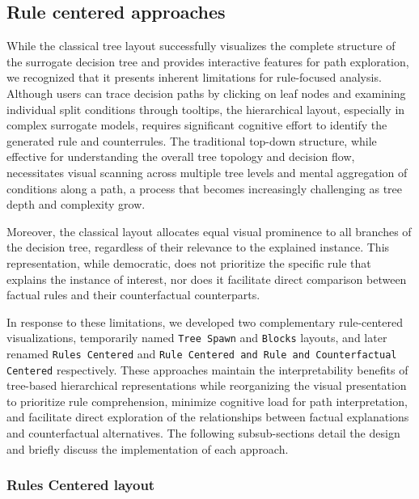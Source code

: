 \subsection{Rule centered approaches}

While the classical tree layout successfully visualizes the complete structure of the surrogate decision tree and provides interactive features for path exploration, we recognized that it presents inherent limitations for rule-focused analysis. Although users can trace decision paths by clicking on leaf nodes and examining individual split conditions through tooltips, the hierarchical layout, especially in complex surrogate models, requires significant cognitive effort to identify the generated rule and counterrules. 
The traditional top-down structure, while effective for understanding the overall tree topology and decision flow, necessitates visual scanning across multiple tree levels and mental aggregation of conditions along a path, a process that becomes increasingly challenging as tree depth and complexity grow.

Moreover, the classical layout allocates equal visual prominence to all branches of the decision tree, regardless of their relevance to the explained instance. This representation, while democratic, does not prioritize the specific rule that explains the instance of interest, nor does it facilitate direct comparison between factual rules and their counterfactual counterparts. 

In response to these limitations, we developed two complementary rule-centered visualizations, temporarily named \texttt{Tree Spawn} and \texttt{Blocks} layouts, and later renamed \texttt{Rules Centered} and \texttt{Rule Centered and Rule and Counterfactual Centered} respectively. These approaches maintain the interpretability benefits of tree-based hierarchical representations while reorganizing the visual presentation to prioritize rule comprehension, minimize cognitive load for path interpretation, and facilitate direct exploration of the relationships between factual explanations and counterfactual alternatives. The following subsub-sections
detail the design and briefly discuss the implementation of each approach.

\subsubsection{Rules Centered layout}

